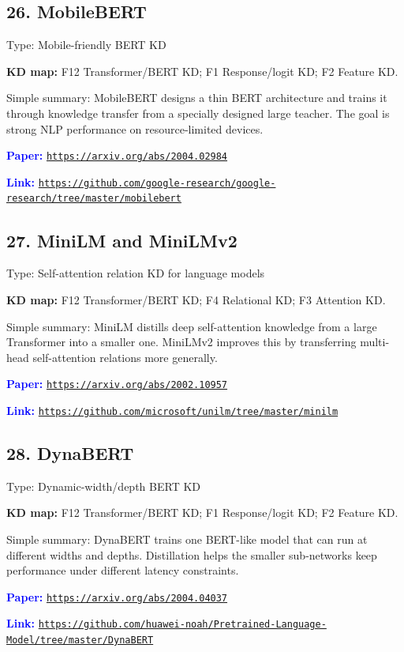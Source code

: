 \documentclass[10pt]{article}
\begin{document}
\subsection*{26. MobileBERT}
Type: Mobile-friendly BERT KD\par
\textbf{KD map:} F12 Transformer/BERT KD; F1 Response/logit KD; F2 Feature KD.\par
Simple summary: MobileBERT designs a thin BERT architecture and trains it through knowledge transfer from a specially designed large teacher. The goal is strong NLP performance on resource-limited devices.\par
\textcolor{blue}{\textbf{Paper:}} \href{https://arxiv.org/abs/2004.02984}{\nolinkurl{https://arxiv.org/abs/2004.02984}}\par
\textcolor{blue}{\textbf{Link:}} \href{https://github.com/google-research/google-research/tree/master/mobilebert}{\nolinkurl{https://github.com/google-research/google-research/tree/master/mobilebert}}\par

\subsection*{27. MiniLM and MiniLMv2}
Type: Self-attention relation KD for language models\par
\textbf{KD map:} F12 Transformer/BERT KD; F4 Relational KD; F3 Attention KD.\par
Simple summary: MiniLM distills deep self-attention knowledge from a large Transformer into a smaller one. MiniLMv2 improves this by transferring multi-head self-attention relations more generally.\par
\textcolor{blue}{\textbf{Paper:}} \href{https://arxiv.org/abs/2002.10957}{\nolinkurl{https://arxiv.org/abs/2002.10957}}\par
\textcolor{blue}{\textbf{Link:}} \href{https://github.com/microsoft/unilm/tree/master/minilm}{\nolinkurl{https://github.com/microsoft/unilm/tree/master/minilm}}\par

\subsection*{28. DynaBERT}
Type: Dynamic-width/depth BERT KD\par
\textbf{KD map:} F12 Transformer/BERT KD; F1 Response/logit KD; F2 Feature KD.\par
Simple summary: DynaBERT trains one BERT-like model that can run at different widths and depths. Distillation helps the smaller sub-networks keep performance under different latency constraints.\par
\textcolor{blue}{\textbf{Paper:}} \href{https://arxiv.org/abs/2004.04037}{\nolinkurl{https://arxiv.org/abs/2004.04037}}\par
\textcolor{blue}{\textbf{Link:}} \href{https://github.com/huawei-noah/Pretrained-Language-Model/tree/master/DynaBERT}{\nolinkurl{https://github.com/huawei-noah/Pretrained-Language-Model/tree/master/DynaBERT}}\par
\end{document}
